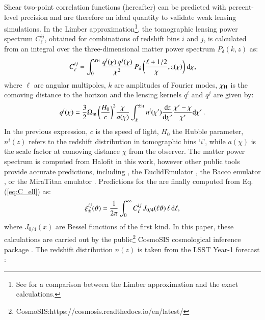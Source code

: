 Shear two-point correlation functions (\gtwopcf hereafter) can be predicted with percent-level precision and are therefore an ideal quantity to validate weak lensing simulations.
In the Limber approximation\footnote{See \citet{Kilbinger17} for a comparison between the Limber approximation and the exact calculations.}, the tomographic lensing power spectrum $C^{ij}_{\ell}$, obtained for combinations of redshift bins $i$ and $j$, is calculated from an integral over the three-dimensional matter power spectrum $P_{\delta}(k, z)$ as:
  \begin{eqnarray}
C_{\ell}^{ij} = \int_0^{\chi_{\rm H}}  \frac{q^i(\chi) \,q^j(\chi)}{\chi^2} \, P_{\delta}\, \bigg(\frac{\ell+1/2}{\chi},z(\chi)\bigg) \ {\rm d}\chi,
\label{eq:C_ell}
\end{eqnarray}
where $\ell$ are angular multipoles, $k$ are amplitudes of Fourier modes, $\chi_{\rm H}$ is the comoving distance to the horizon and the lensing kernels $q^{i}$ and $q^j$ are given by:
\begin{eqnarray}
q^{i}(\chi) = \frac{3}{2}\Omega_{\rm m} \, \bigg(\frac{H_0}{c} \bigg)^2 \frac{\chi}{a(\chi)} \int_{\chi}^{\chi_{\rm H}} n^i(\chi')\frac{{\rm d}z}{{\rm d} \chi'}\frac{\chi' - \chi}{\chi'}{\rm d}\chi' \, .
\label{eq:q_lensing}
\end{eqnarray}
In the previous expression, $c$ is the speed of light, $H_0$ the Hubble parameter, $n^i(z)$ refers to the redshift distribution  in tomographic bins `$i$', while $a(\chi)$ is the scale factor at comoving distance $\chi$ from the observer.
The matter power spectrum is computed from  {\sc Halofit} \citep{Takahashi2012} in this work, however other public tools provide accurate predictions, including  \citep{HMCode2020}, the {\sc EuclidEmulator} \citep{EuclidEmulator}, the {\sc Bacco} emulator \citep{BACCOEmulator}, or the {\sc MiraTitan} emulator \citep{miraTitan}. 
Predictions for the \gtwopcf are finally computed from Eq. (\ref{eq:C_ell}) as:
\begin{eqnarray}
\xi_{\pm}^{ij}(\vartheta) = \frac{1}{2\pi} \int_0^{\infty} C_{\ell}^{ij} \, J_{0/4}(\ell \vartheta) \, \ell \, {\rm d}\ell,
\label{eq:xipm_th}
\end{eqnarray}
where $J_{0/4}(x)$ are Bessel functions of the first kind. 
In this paper, these calculations are carried out by the public\footnote{{\sc CosmoSIS}:https://cosmosis.readthedocs.io/en/latest/ } {\sc CosmoSIS} cosmological inference package \citep{cosmoSIS}.
The redshift distribution $n (z)$ is taken from the LSST Year-1 forecast \citep{LSST-SRD}:
